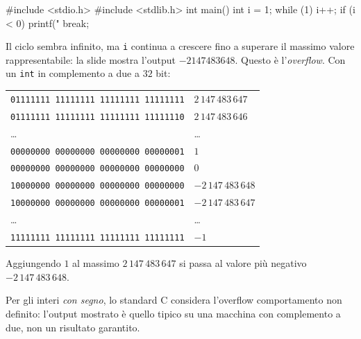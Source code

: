 \documentclass[11pt,a4paper]{article}
\begin{document}
\begin{codice}
#include <stdio.h>
#include <stdlib.h>
int main() {
    int i = 1;
    while (1) {
        i++;
        if (i < 0) {
            printf("%
            break;
        }
    }
}
\end{codice}
Il ciclo sembra infinito, ma \lstinline|i| continua a crescere fino a superare il massimo valore rappresentabile: la slide mostra l'output $-2147483648$. Questo è l'\emph{overflow}. Con un \lstinline|int| in complemento a due a $32$ bit:
\begin{center}
\small
\begin{tabular}{@{}ll@{}}
\texttt{01111111 11111111 11111111 11111111} & $2\,147\,483\,647$ \\
\texttt{01111111 11111111 11111111 11111110} & $2\,147\,483\,646$ \\
\dots & \dots \\
\texttt{00000000 00000000 00000000 00000001} & $1$ \\
\texttt{00000000 00000000 00000000 00000000} & $0$ \\
\texttt{10000000 00000000 00000000 00000000} & $-2\,147\,483\,648$ \\
\texttt{10000000 00000000 00000000 00000001} & $-2\,147\,483\,647$ \\
\dots & \dots \\
\texttt{11111111 11111111 11111111 11111111} & $-1$ \\
\end{tabular}
\end{center}
Aggiungendo $1$ al massimo $2\,147\,483\,647$ si passa al valore più negativo $-2\,147\,483\,648$.

\begin{osservazione}
Per gli interi \emph{con segno}, lo standard C considera l'overflow comportamento non definito: l'output mostrato è quello tipico su una macchina con complemento a due, non un risultato garantito.
\end{osservazione}
\end{document}
